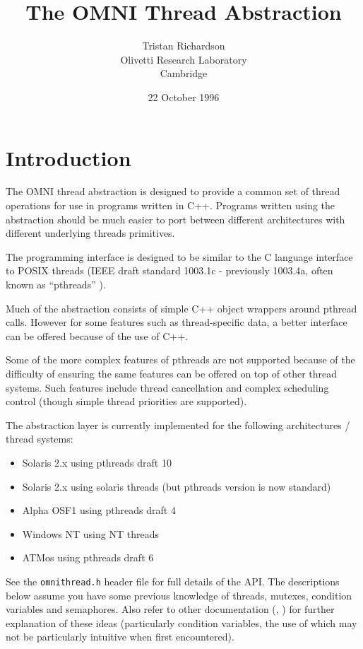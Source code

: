 \documentclass[11pt]{article}
\title{The OMNI Thread Abstraction}
\author{Tristan Richardson\\
Olivetti Research Laboratory \\
Cambridge \\
}
\date{22 October 1996}
\begin{document}
\maketitle

\section{Introduction}

The OMNI thread abstraction is designed to provide a common set of thread
operations for use in programs written in C++.  Programs written using the
abstraction should be much easier to port between different architectures with
different underlying threads primitives.

The programming interface is designed to be similar to the C language interface
to POSIX threads (IEEE draft standard 1003.1c - previously 1003.4a, often known
as ``pthreads'' \cite{pthreads}).

Much of the abstraction consists of simple C++ object wrappers around pthread
calls.  However for some features such as thread-specific data, a better
interface can be offered because of the use of C++.

Some of the more complex features of pthreads are not supported because of the
difficulty of ensuring the same features can be offered on top of other thread
systems.  Such features include thread cancellation and complex scheduling
control (though simple thread priorities are supported).

The abstraction layer is currently implemented for the following architectures
/ thread systems:

\begin{itemize}

\item Solaris 2.x using pthreads draft 10
\item Solaris 2.x using solaris threads (but pthreads version is now standard)
\item Alpha OSF1 using pthreads draft 4
\item Windows NT using NT threads
\item ATMos using pthreads draft 6

\end{itemize}

See the {\tt omnithread.h} header file for full details of the API.  The
descriptions below assume you have some previous knowledge of threads, mutexes,
condition variables and semaphores.  Also refer to other documentation
(\cite{birrell}, \cite{pthreads}) for further explanation of these ideas
(particularly condition variables, the use of which may not be particularly
intuitive when first encountered).
\end{document}
